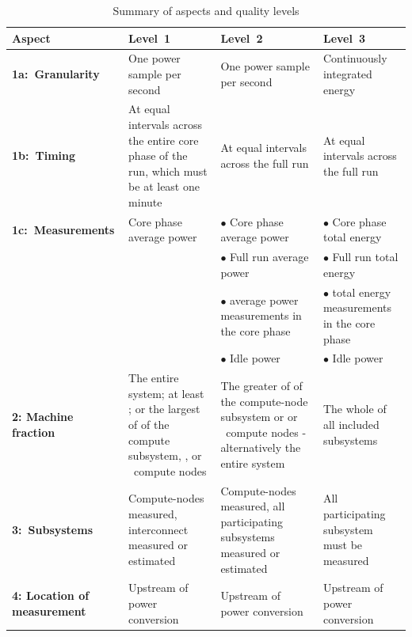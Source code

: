 \begin{table}
\caption{Summary of aspects and quality levels}
\label{tab:levels}
\begin{tabular}{|p{2.5cm}|p{3.5cm}|p{3.5cm}|p{3.5cm}|} \hline
\textbf{Aspect}&\textbf{Level~1}&\textbf{Level~2}&\textbf{Level~3}\\ \hline

\textbf{1a:~Granularity} &
One power sample per second &
One power sample per second &
Continuously integrated energy\\
\hline


\textbf{1b:~Timing} &
At equal intervals across the entire core phase of the run, which must be at least one minute &
At equal intervals across the full run &
At equal intervals across the full run   \\
\hline

\textbf{1c:~Measurements} &
Core phase average power &
$\bullet$ Core phase average power & 
$\bullet$ Core phase total energy \\ %

 & &
$\bullet$ Full run average power &
$\bullet$ Full run total energy \\

 & &
$\bullet$ \MinMeasurementsCorePhaseLTwoThree{} average power measurements in the core phase &
$\bullet$ \MinMeasurementsCorePhaseLTwoThree{} total energy measurements in the core phase \\

 & &
$\bullet$ Idle power &
$\bullet$ Idle power \\
\hline

\textbf{2: Machine \newline fraction}  &
The entire system; at least \SpecPowerMaxLOne{}; or the largest of \SpecFracMinLOne{} of the compute subsystem, \SpecPowerMinLOne{}, or \SpecMinNodes{}~compute nodes &
The greater of \SpecFracMinLTwo{} of the compute-node subsystem or \SpecPowerMinLTwo{} or \SpecMinNodes{}~compute nodes - alternatively the entire system &
The whole of all included subsystems \\
\hline

\textbf{3:~Subsystems} &
Compute-nodes measured, interconnect measured or estimated &
Compute-nodes measured, all participating subsystems measured or estimated &
All participating subsystem must be measured \\
\hline

\textbf{4: Location of measurement} &
Upstream of power conversion &
Upstream of power conversion &
Upstream of power conversion\\


\end{tabular}
\end{table}
